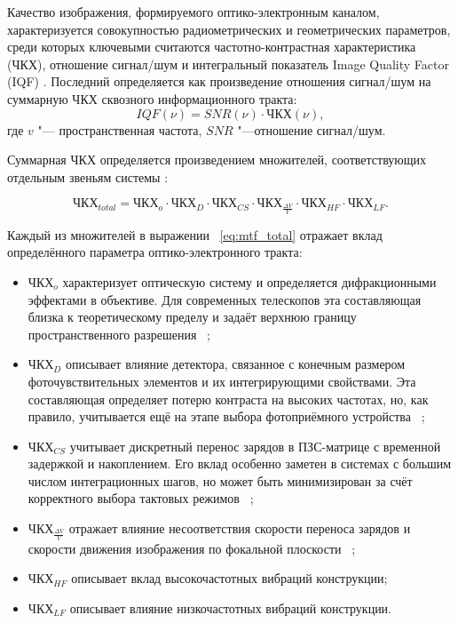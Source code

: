 Качество изображения, формируемого оптико-электронным каналом, характеризуется совокупностью радиометрических и геометрических параметров, среди которых ключевыми считаются частотно-контрастная характеристика (ЧКХ), отношение сигнал/шум и интегральный показатель Image Quality Factor (IQF) \cite{leachtenauer1997general}. Последний определяется как произведение отношения сигнал/шум на суммарную ЧКХ сквозного информационного тракта:
\begin{equation}
	\label{eq:eq_IQF}
	 IQF(\nu)=SNR(\nu)\cdot \text{ЧКХ}(\nu),
\end{equation}
	где \( v \) "--- пространственная частота, \( SNR \) "---отношение сигнал/шум.
	
	
Суммарная ЧКХ определяется произведением множителей, соответствующих отдельным звеньям системы \cite{wahballah2018smear}:

\begin{equation}
	\label{eq:mtf_total}
	\text{ЧКХ}_{total}=\text{ЧКХ}_o\cdot \text{ЧКХ}_D \cdot \text{ЧКХ}_{CS} \cdot \text{ЧКХ}_{\frac{\Delta V}{V}} \cdot \text{ЧКХ}_{HF} \cdot \text{ЧКХ}_{LF}.
	\end{equation}

Каждый из множителей в выражении ~\eqref{eq:mtf_total} отражает вклад определённого параметра оптико-электронного тракта:

\begin{itemize}
	\item \(\text{ЧКХ}_o\) характеризует оптическую систему и определяется дифракционными эффектами в объективе. Для современных телескопов эта составляющая близка к теоретическому пределу и задаёт верхнюю границу пространственного разрешения ~\cite{Abolghasemi2012};
	\item \(\text{ЧКХ}_D\) описывает влияние детектора, связанное с конечным размером фоточувствительных элементов и их интегрирующими свойствами. Эта составляющая определяет потерю контраста на высоких частотах, но, как правило, учитывается ещё на этапе выбора фотоприёмного устройства ~\cite{Joseph2015};
	\item \(\text{ЧКХ}_{CS}\)  учитывает дискретный перенос зарядов в ПЗС-матрице с временной задержкой и накоплением. Его вклад особенно заметен в системах с большим числом интеграционных шагов, но может быть минимизирован за счёт корректного выбора тактовых режимов ~\cite{Wong1992};
	\item \(\text{ЧКХ}_{\frac{\Delta V}{V}}\) отражает влияние несоответствия скорости переноса зарядов и скорости движения изображения по фокальной плоскости ~\cite{Wong1992};
	\item \(\text{ЧКХ}_{HF}\) описывает вклад высокочастотных вибраций конструкции;
	\item \(\text{ЧКХ}_{LF}\) описывает влияние низкочастотных вибраций конструкции.
\end{itemize}

